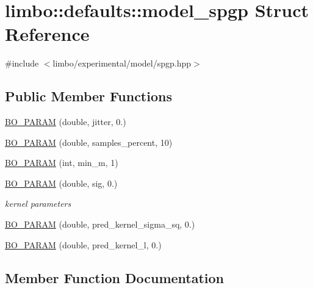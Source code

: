 \hypertarget{structlimbo_1_1defaults_1_1model__spgp}{}\section{limbo\+:\+:defaults\+:\+:model\+\_\+spgp Struct Reference}
\label{structlimbo_1_1defaults_1_1model__spgp}


{\ttfamily \#include $<$limbo/experimental/model/spgp.\+hpp$>$}

\subsection*{Public Member Functions}
\begin{DoxyCompactItemize}
\item 
\hyperlink{structlimbo_1_1defaults_1_1model__spgp_a233526d7737f28a5fb21d30dfc97b88a}{B\+O\+\_\+\+P\+A\+R\+A\+M} (double, jitter, 0.)
\item 
\hyperlink{structlimbo_1_1defaults_1_1model__spgp_a596e9fd2900c89e3cb853e376ef330df}{B\+O\+\_\+\+P\+A\+R\+A\+M} (double, samples\+\_\+percent, 10)
\item 
\hyperlink{structlimbo_1_1defaults_1_1model__spgp_aca6ad6e862138f56f81c4ba2670a96a5}{B\+O\+\_\+\+P\+A\+R\+A\+M} (int, min\+\_\+m, 1)
\item 
\hyperlink{structlimbo_1_1defaults_1_1model__spgp_a61fc726411e68ac66133caa81da1ab32}{B\+O\+\_\+\+P\+A\+R\+A\+M} (double, sig, 0.)
\begin{DoxyCompactList}\small\item\em kernel parameters \end{DoxyCompactList}\item 
\hyperlink{structlimbo_1_1defaults_1_1model__spgp_a5fb4bbd324231c8860e8a3bfccea9c64}{B\+O\+\_\+\+P\+A\+R\+A\+M} (double, pred\+\_\+kernel\+\_\+sigma\+\_\+sq, 0.)
\item 
\hyperlink{structlimbo_1_1defaults_1_1model__spgp_a69f03332d95f9c38f890cf604518e290}{B\+O\+\_\+\+P\+A\+R\+A\+M} (double, pred\+\_\+kernel\+\_\+l, 0.)
\end{DoxyCompactItemize}


\subsection{Member Function Documentation}
\hypertarget{structlimbo_1_1defaults_1_1model__spgp_a233526d7737f28a5fb21d30dfc97b88a}{}
